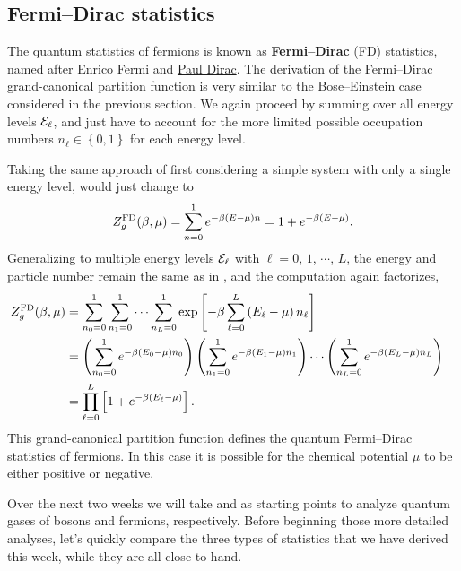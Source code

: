 \subsection{Fermi--Dirac statistics}
The quantum statistics of fermions is known as \textbf{Fermi--Dirac} (FD) statistics, named after Enrico Fermi and \href{https://en.wikipedia.org/wiki/Paul_Dirac}{Paul Dirac}.
The derivation of the Fermi--Dirac grand-canonical partition function is very similar to the Bose--Einstein case considered in the previous section.
We again proceed by summing over all energy levels $\mathcal E_{\ell}$, and just have to account for the more limited possible occupation numbers $n_{\ell} \in \left\{0, 1\right\}$ for each energy level.

Taking the same approach of first considering a simple system with only a single energy level,  would just change to
\begin{equation*}
  Z_g^{\text{FD}}(\beta, \mu) = \sum_{n = 0}^1 e^{-\beta (E - \mu) n} = 1 + e^{-\beta (E - \mu)}.
\end{equation*}
Generalizing to multiple energy levels $\mathcal E_{\ell}$ with $\ell = 0$, $1$, $\cdots$, $L$, the energy and particle number remain the same as in , and the computation again factorizes,
\begin{align}
  Z_g^{\text{FD}}(\beta, \mu) & = \sum_{n_0 = 0}^1 \sum_{n_1 = 0}^1 \cdots \sum_{n_L = 0}^1 \exp\left[-\beta\sum_{\ell = 0}^L \left(E_{\ell} - \mu\right) n_{\ell}\right] \cr
                 & = \left(\sum_{n_0 = 0}^1 e^{-\beta (E_0 - \mu) n_0}\right) \left(\sum_{n_1 = 0}^1 e^{-\beta (E_1 - \mu) n_1}\right)\cdots \left(\sum_{n_L = 0}^1 e^{-\beta (E_L - \mu) n_L}\right) \cr
                 & = \prod_{\ell = 0}^L \left[1 + e^{-\beta (E_{\ell} - \mu)}\right]. \label{eq:partfunc_FD}
\end{align}
This grand-canonical partition function defines the quantum Fermi--Dirac statistics of fermions.
In this case it is possible for the chemical potential $\mu$ to be either positive or negative.

Over the next two weeks we will take \ZBE and \ZFD as starting points to analyze quantum gases of bosons and fermions, respectively.
Before beginning those more detailed analyses, let's quickly compare the three types of statistics that we have derived this week, while they are all close to hand.



